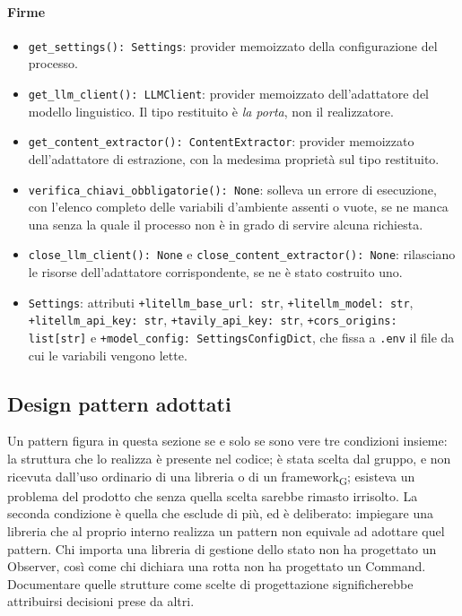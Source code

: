 \documentclass[a4paper, 10pt]{article}
\newenvironment{firme}{%
  \begin{itemize}[leftmargin=1.4em, topsep=4pt, itemsep=4pt, parsep=0pt]
  \raggedright
}{%
  \end{itemize}%
}
\begin{document}
\paragraph{Firme}
\begin{firme}
    \item \texttt{get\_settings(): Settings}: provider memoizzato della configurazione del processo.

    \item \texttt{get\_llm\_client(): LLMClient}: provider memoizzato dell'adattatore del modello linguistico. Il tipo restituito è \textit{la porta}, non il realizzatore.

    \item \texttt{get\_content\_extractor(): ContentExtractor}: provider memoizzato dell'adattatore di estrazione, con la medesima proprietà sul tipo restituito.

    \item \texttt{verifica\_chiavi\_obbligatorie(): None}: solleva un errore di esecuzione, con l'elenco completo delle variabili d'ambiente assenti o vuote, se ne manca una senza la quale il processo non è in grado di servire alcuna richiesta.

    \item \texttt{close\_llm\_client(): None} e \texttt{close\_content\_extractor(): None}: rilasciano le risorse dell'adattatore corrispondente, se ne è stato costruito uno.

    \item \texttt{Settings}: attributi \texttt{+litellm\_base\_url: str}, \texttt{+litellm\_model: str}, \texttt{+litellm\_api\_key: str}, \texttt{+tavily\_api\_key: str}, \texttt{+cors\_origins: list[str]} e \texttt{+model\_config: SettingsConfigDict}, che fissa a \texttt{.env} il file da cui le variabili vengono lette.
\end{firme}

\subsection{Design pattern adottati}
\label{sec:design-pattern}
Un pattern figura in questa sezione se e solo se sono vere tre condizioni insieme: la struttura che lo realizza è presente nel codice; è stata scelta dal gruppo, e non ricevuta dall'uso ordinario di una libreria o di un framework\textsubscript{G}; esisteva un problema del prodotto che senza quella scelta sarebbe rimasto irrisolto. La seconda condizione è quella che esclude di più, ed è deliberato: impiegare una libreria che al proprio interno realizza un pattern non equivale ad adottare quel pattern. Chi importa una libreria di gestione dello stato non ha progettato un Observer, così come chi dichiara una rotta non ha progettato un Command. Documentare quelle strutture come scelte di progettazione significherebbe attribuirsi decisioni prese da altri.
\end{document}
